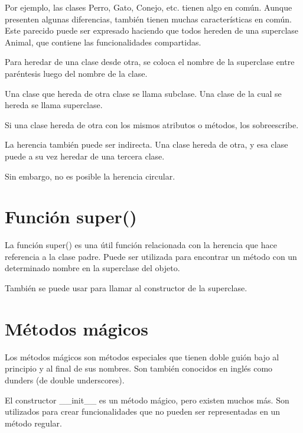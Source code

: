 \documentclass{report}
\begin{document}
Por ejemplo, las clases Perro, Gato, Conejo, etc. tienen algo en común. Aunque presenten algunas diferencias, también tienen muchas características en común. Este parecido puede ser expresado haciendo que todos hereden de una superclase Animal, que contiene las funcionalidades compartidas.\smallskip

Para heredar de una clase desde otra, se coloca el nombre de la superclase entre paréntesis luego del nombre de la clase.


Una clase que hereda de otra clase se llama subclase. Una clase de la cual se hereda se llama superclase.\smallskip

Si una clase hereda de otra con los mismos atributos o métodos, los sobreescribe.


La herencia también puede ser indirecta. Una clase hereda de otra, y esa clase puede a su vez heredar de una tercera clase.


Sin embargo, no es posible la herencia circular.

\section{Función super()}

La función super() es una útil función relacionada con la herencia que hace referencia a la clase padre. Puede ser utilizada para encontrar un método con un determinado nombre en la superclase del objeto.


También se puede usar para llamar al constructor de la superclase.


\section{Métodos mágicos}

Los métodos mágicos son métodos especiales que tienen doble guión bajo al principio y al final de sus nombres. Son también conocidos en inglés como dunders (de double underscores).\smallskip

El constructor \_\_init\_\_ es un método mágico, pero existen muchos más. Son utilizados para crear funcionalidades que no pueden ser representadas en un método regular.
\end{document}
